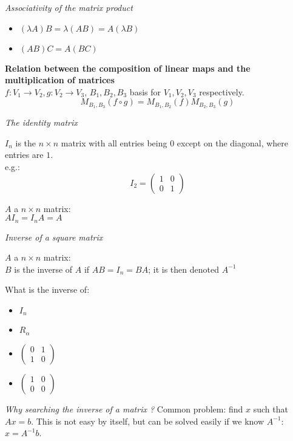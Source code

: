 \textit{Associativity of the matrix product}
\begin{itemize}
	\item $(\lambda A)B = \lambda(AB) = A(\lambda B)$
	\item $(AB)C = A(BC)$
\end{itemize}

\textbf{Relation between the composition of linear maps and the multiplication of matrices}\\
$f:V_1 \to V_2, g:V_2 \to V_3$, $B_1,B_2,B_3$ basis for $V_1,V_2,V_3$ respectively.
$$
M_{B_1,B_3}(f \circ g)=M_{B_1,B_2}(f)M_{B_2,B_3}(g)
$$

\textit{The identity matrix}
\begin{definition}
	$I_n$ is the $n \times n$ matrix with all entries being $0$ except on the diagonal, where entries are $1$.\\
	e.g.:
	$$
	I_2 = 
	\begin{pmatrix}
		1&0\\
		0&1
	\end{pmatrix}
	$$
\end{definition}
\begin{property}
	$A$ a $n \times n$ matrix:\\
	$A I_n = I_n A = A$
\end{property}

\textit{Inverse of a square matrix}
\begin{definition}
	$A$ a $n \times n$ matrix:\\
	$B$ is the inverse of $A$ if $AB = I_n = BA$; it is then denoted $A^{-1}$
\end{definition}
\begin{question}
	What is the inverse of:
	\begin{itemize}
		\item $I_n$
		\item $R_\alpha$
		\item $\begin{pmatrix} 0&1\\ 1&0 \end{pmatrix}$
		\item $\begin{pmatrix} 1&0\\ 0&0 \end{pmatrix}$
	\end{itemize}
\end{question}

\textit{Why searching the inverse of a matrix ?}
Common problem: find $x$ such that $Ax=b$. This is not easy by itself, but can be solved easily if we know $A^{-1}$: $x=A^{-1}b$.

